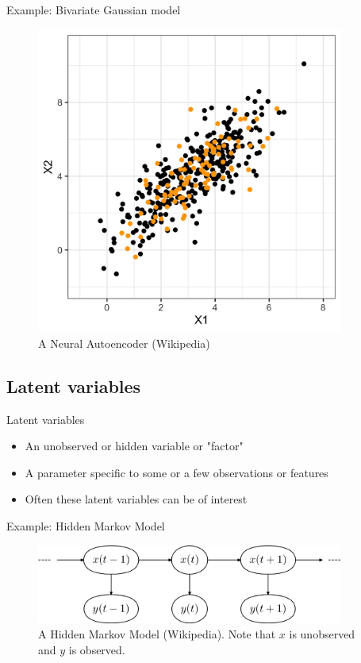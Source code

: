 \documentclass[10pt]{beamer}
\begin{document}
\begin{frame}{Example: Bivariate Gaussian model}

\begin{figure}[h]
\centering
\includegraphics[width=0.9\textwidth]{fig/bi_model.png}
\caption{A Neural Autoencoder (Wikipedia)}
\end{figure}

\end{frame}




\subsection{Latent variables}

\begin{frame}{Latent variables}
\begin{itemize}
\item An {\color{uured} unobserved} or {\color{uured} hidden} variable or "factor"\pause
\item A parameter specific to some or a few observations or features\pause
\item Often these latent variables can be of interest
\end{itemize}

\end{frame}

\begin{frame}{Example: Hidden Markov Model}

\begin{figure}[h]
\centering
\includegraphics[width=0.9\textwidth]{fig/hmm.png}
\caption{A Hidden Markov Model (Wikipedia). Note that $x$ is unobserved and $y$ is observed.}
\end{figure}

\end{frame}
\end{document}
